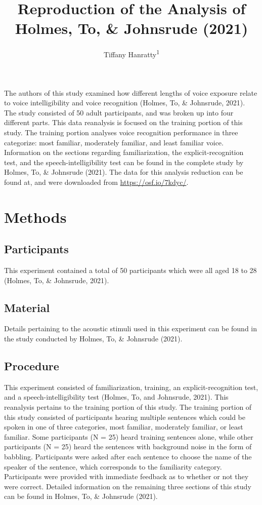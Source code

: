 \documentclass[
  english,
  man]{apa6}
\title{Reproduction of the Analysis of Holmes, To, \& Johnsrude (2021)}
\author{Tiffany Hanratty\textsuperscript{1}}
\date{}
\affiliation{\vspace{0.5cm}\textsuperscript{1} Brooklyn College}
\begin{document}
\maketitle

The authors of this study examined how different lengths of voice exposure relate to voice intelligibility and voice recognition (Holmes, To, \& Johnsrude, 2021). The study consisted of 50 adult participants, and was broken up into four different parts. This data reanalysis is focused on the training portion of this study. The training portion analyses voice recognition performance in three categorize: most familiar, moderately familiar, and least familiar voice. Information on the sections regarding familiarization, the explicit-recognition test, and the speech-intelligibility test can be found in the complete study by Holmes, To, \& Johnsrude (2021).
The data for this analysis reduction can be found at, and were downloaded from \url{https://osf.io/7kdyc/}.

\hypertarget{methods}{%
\section{Methods}\label{methods}}

\hypertarget{participants}{%
\subsection{Participants}\label{participants}}

This experiment contained a total of 50 participants which were all aged 18 to 28 (Holmes, To, \& Johnsrude, 2021).

\hypertarget{material}{%
\subsection{Material}\label{material}}

Details pertaining to the acoustic stimuli used in this experiment can be found in the study conducted by Holmes, To, \& Johnsrude (2021).

\hypertarget{procedure}{%
\subsection{Procedure}\label{procedure}}

This experiment consisted of familiarization, training, an explicit-recognition test, and a speech-intelligibility test (Holmes, To, and Johnsrude, 2021). This reanalysis pertains to the training portion of this study. The training portion of this study consisted of participants hearing multiple sentences which could be spoken in one of three categories, most familiar, moderately familiar, or least familiar. Some participants (N = 25) heard training sentences alone, while other participants (N = 25) heard the sentences with background noise in the form of babbling. Participants were asked after each sentence to choose the name of the speaker of the sentence, which corresponds to the familiarity category. Participants were provided with immediate feedback as to whether or not they were correct. Detailed information on the remaining three sections of this study can be found in Holmes, To, \& Johnsrude (2021).
\end{document}

